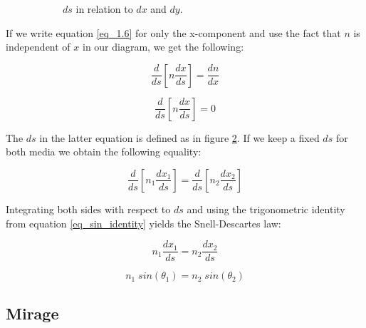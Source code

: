 \documentclass{article}
\begin{document}
\begin{figure}[h!]
\begin{subfigure}[b]{0.2\textwidth}
	\caption{$ds$ in relation to $dx$ and $dy$.}
	\label{fig_ds}
  \end{subfigure}
  \caption{}
\end{figure}


If we write equation \ref{eq_1.6} for only the x-component and use the fact that $n$ is independent of $x$ in our diagram, we get the following:

\begin{equation*}
	\frac{d}{ds} \left[ n \frac{d x}{ds} \right] = \frac{d n}{dx}
\end{equation*}

\begin{equation*}
	\frac{d}{ds} \left[ n \frac{d x}{ds} \right] = 0
\end{equation*}

The $ds$ in the latter equation is defined as in figure \ref{fig_ds}. If we keep a fixed $ds$ for both media we obtain the following equality:

\begin{equation*}
	\frac{d}{ds} \left[ n_1 \frac{d x_1}{ds} \right] = \frac{d}{ds} \left[ n_2 \frac{d x_2}{ds} \right]
\end{equation*}

Integrating both sides with respect to $ds$ and using the trigonometric identity from equation \ref{eq_sin_identity} yields the Snell-Descartes law:

\begin{equation*}
	n_1 \frac{d x_1}{ds}=n_2 \frac{d x_2}{ds}
\end{equation*}

\begin{equation}
	n_1 \; sin(\theta _1) = n_2 \; sin(\theta _2)
	\label{eq_snell}
\end{equation}

\newpage
\subsection{Mirage}
\end{document}
